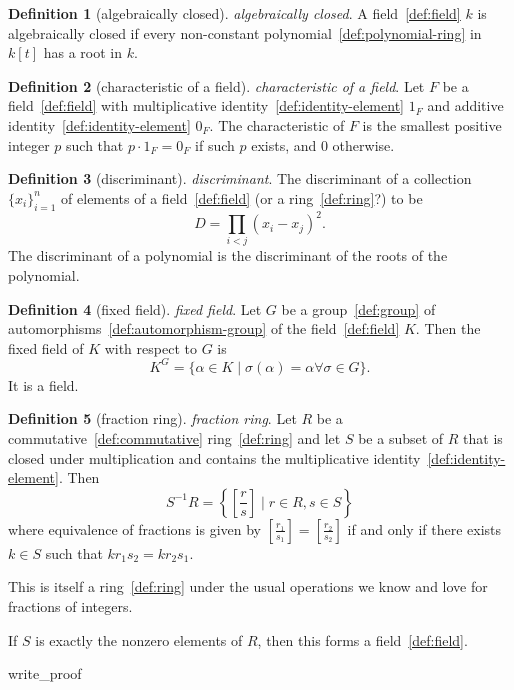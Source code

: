 \documentclass[12pt,a4paper]{article}
\theoremstyle{definition}
\newtheorem{definition}{Definition}
\begin{document}
\begin{definition}[algebraically closed]\label{def:algebraically-closed}
\emph{algebraically closed}. A field~\ref{def:field} $k$ is algebraically closed if every non-constant polynomial~\ref{def:polynomial-ring} in $k[t]$ has a root in $k$.
\end{definition}

\begin{definition}[characteristic of a field]\label{def:characteristic-of-a-field}
\emph{characteristic of a field}. Let $F$ be a field~\ref{def:field} with multiplicative identity~\ref{def:identity-element} $1_F$ and additive identity~\ref{def:identity-element} $0_F$. The characteristic of $F$ is the smallest positive integer $p$ such that $p\cdot 1_F=0_F$ if such $p$ exists, and $0$ otherwise.
\end{definition}

\begin{definition}[discriminant]\label{def:discriminant}
\emph{discriminant}. The discriminant of a collection $\{x_i\}_{i=1}^n$ of elements of a field~\ref{def:field} (or a ring~\ref{def:ring}?) to be $$D = \prod_{i<j} (x_i-x_j)^2.$$ The discriminant of a polynomial is the discriminant of the roots of the polynomial.
\end{definition}

\begin{definition}[fixed field]\label{def:fixed-field}
\emph{fixed field}. Let $G$ be a group~\ref{def:group} of automorphisms~\ref{def:automorphism-group} of the field~\ref{def:field} $K$. Then the fixed field of $K$ with respect to $G$ is $$K^G = \{\alpha\in K\mid \sigma(\alpha) = \alpha\forall \sigma\in G\}.$$
It is a field.
\end{definition}

\begin{definition}[fraction ring]\label{def:fraction-ring}
\emph{fraction ring}. Let $R$ be a commutative~\ref{def:commutative} ring~\ref{def:ring} and let $S$ be a subset of $R$ that is closed under multiplication and contains the multiplicative identity~\ref{def:identity-element}. Then $$S^{-1}R = \left\{\left[\frac{r}{s}\right]\mid r\in R,s\in S\right\}$$  where equivalence of fractions is given by $\left[\frac{r_1}{s_1}\right] =\left[\frac{r_2}{s_2}\right]$ if and only if there exists $k \in S$ such that $kr_1s_2 = kr_2s_1$.
 
This is itself a ring~\ref{def:ring} under the usual operations we know and love for fractions of integers. 
 
If $S$ is exactly the nonzero elements of $R$, then this forms a field~\ref{def:field}.
 
 write_proof
\end{definition}
\end{document}
